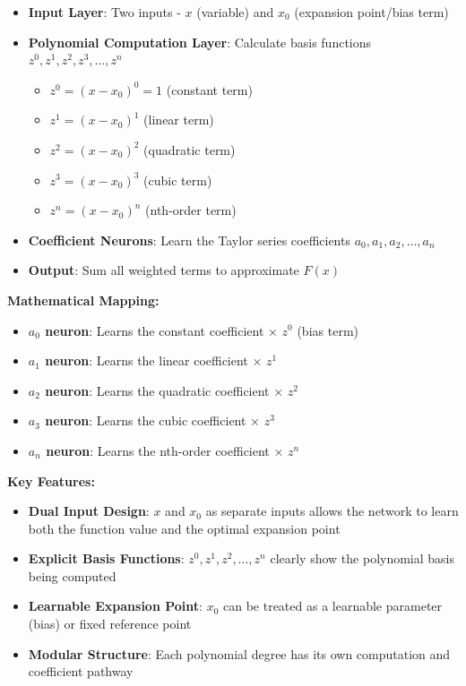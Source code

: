 \begin{itemize}
\item \textbf{Input Layer}: Two inputs - $x$ (variable) and $x_0$ (expansion point/bias term)
\item \textbf{Polynomial Computation Layer}: Calculate basis functions $z^0, z^1, z^2, z^3, \ldots, z^n$
\begin{itemize}
\item $z^0 = (x-x_0)^0 = 1$ (constant term)
\item $z^1 = (x-x_0)^1$ (linear term)
\item $z^2 = (x-x_0)^2$ (quadratic term)
\item $z^3 = (x-x_0)^3$ (cubic term)
\item $z^n = (x-x_0)^n$ (nth-order term)
\end{itemize}
\item \textbf{Coefficient Neurons}: Learn the Taylor series coefficients $a_0, a_1, a_2, \ldots, a_n$
\item \textbf{Output}: Sum all weighted terms to approximate $F(x)$
\end{itemize}

\textbf{Mathematical Mapping:}

\begin{itemize}
\item \textbf{$a_0$ neuron}: Learns the constant coefficient × $z^0$ (bias term)
\item \textbf{$a_1$ neuron}: Learns the linear coefficient × $z^1$
\item \textbf{$a_2$ neuron}: Learns the quadratic coefficient × $z^2$
\item \textbf{$a_3$ neuron}: Learns the cubic coefficient × $z^3$
\item \textbf{$a_n$ neuron}: Learns the nth-order coefficient × $z^n$
\end{itemize}

\textbf{Key Features:}

\begin{itemize}
\item \textbf{Dual Input Design}: $x$ and $x_0$ as separate inputs allows the network to learn both the function value and the optimal expansion point
\item \textbf{Explicit Basis Functions}: $z^0, z^1, z^2, \ldots, z^n$ clearly show the polynomial basis being computed
\item \textbf{Learnable Expansion Point}: $x_0$ can be treated as a learnable parameter (bias) or fixed reference point
\item \textbf{Modular Structure}: Each polynomial degree has its own computation and coefficient pathway
\end{itemize}

